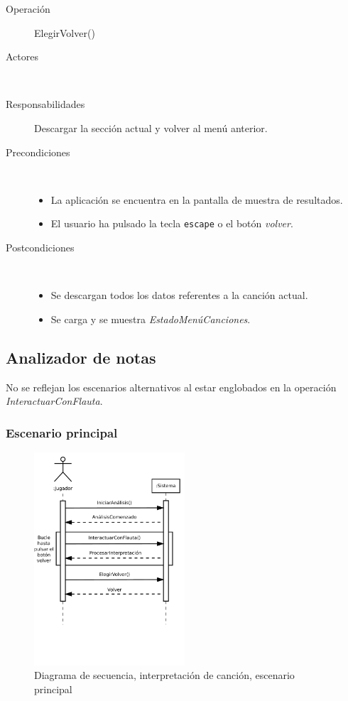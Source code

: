\begin{description}
\item[Operación] ElegirVolver()
\item[Actores] \jugador\, \sistema\
\item[Responsabilidades] Descargar la sección actual y volver al menú anterior.
\item[Precondiciones] $\quad$
  \begin{itemize}
  \item La aplicación se encuentra en la pantalla de muestra de resultados.
  \item El usuario ha pulsado la tecla \texttt{escape} o el botón \textit{volver}.
  \end{itemize}
\item[Postcondiciones] $\quad$
  \begin{itemize}
  \item Se descargan todos los datos referentes a la canción actual.
  \item Se carga y se muestra \textit{EstadoMenúCanciones}.
  \end{itemize}
\end{description}

\subsection{Analizador de notas}

\begin{nota}
  No se reflejan los escenarios alternativos al estar englobados en la operación
  \textit{InteractuarConFlauta}.
\end{nota}

\subsubsection{Escenario principal}
\begin{figure}[h!]
  \centering
  \includegraphics[trim=0cm 8cm 0cm 0cm, clip=true, width=0.5\textwidth]{4_analisis/diagsec_caso5}
  \caption{Diagrama de secuencia, interpretación de canción, escenario principal}
\end{figure}

